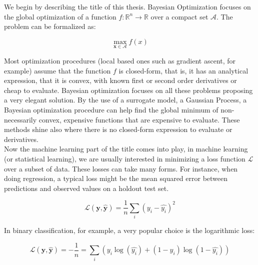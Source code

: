 \documentclass[10pt,a4paper,twoside]{book}
\begin{document}
We begin by describing the title of this thesis. Bayesian Optimization focuses on the global optimization of a function $f:\mathbb{R}^n \rightarrow \mathbb{R}$ over a compact set $\mathcal{A}$. The problem can be formalized as:

\begin{equation}
\max_{\boldsymbol{x}\in \mathcal{A}} f(x)
\end{equation}

Most optimization procedures (local based ones such as gradient ascent, for example) assume that the function $f$ is closed-form, that is, it has an analytical expression, that it is convex, with known first or second order derivatives or cheap to evaluate. Bayesian optimization focuses on all these problems proposing a very elegant solution. By the use of a surrogate model, a Gaussian Process, a Bayesian optimization procedure can help find the global minimum of non-necessarily convex, expensive functions that are expensive to evaluate. These methods shine also where there is no closed-form expression to evaluate or derivatives.\\

Now the machine learning part of the title comes into play, in machine learning (or statistical learning), we are usually interested in minimizing a loss function $\mathcal{L}$ over a subset of data. These losses can take many forms. For instance, when doing regression, a typical loss might be the mean squared error between predictions and observed values on a holdout test set.

\begin{equation}
\mathcal{L}(\boldsymbol{y}, \boldsymbol{\hat{y}}) = \dfrac{1}{n} \sum_i \left(y_i - \hat{y_i}\right)^2
\end{equation}

In binary classification, for example, a very popular choice is the logarithmic loss:

\begin{equation}
\mathcal{L}(\boldsymbol{y}, \boldsymbol{\hat{y}}) = -\dfrac{1}{n} = \sum_i \left(y_i \log(\hat{y_i}) + (1 - y_i)\log(1-\hat{y_i})\right)
\end{equation}
\end{document}
